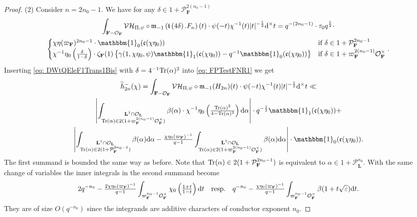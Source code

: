 \documentclass[A4]{amsart}
\numberwithin{equation}{section} \everymath{\displaystyle}
\newcommand{\Tr}{{\rm Tr}}
\newcommand{\id}{\mathbbm{1}}
\newcommand{\ud}{\mathrm{d}}
\newcommand{\F}{\mathbf{F}}
\newcommand{\bL}{\mathbf{L}}
\newcommand{\vO}{\mathcal{O}}
\newcommand{\vP}{\mathcal{P}}
\newcommand{\norm}[1][\cdot]{\lvert #1 \rvert}
\newcommand{\extnorm}[1]{\left\lvert #1 \right\rvert}
\newcommand{\Mult}{\mathfrak{m}}
\newcommand{\VorH}{\mathcal{VH}}
\newcommand{\Trans}{\mathfrak{t}}
\newcommand{\cond}{\mathfrak{c}}
\begin{document}
\begin{proof}
\noindent (2) Consider $n=2n_0-1$. We have for any $\delta \in 1+\vP_{\F}^{2(n_0-1)}$
\begin{multline} \label{eq: DWtQEleF1Trans1Bis}
	\int_{\F-\vO_{\F}} \VorH_{\Pi,\psi} \circ \Mult_{-1} \left( \Trans \left( 4\delta \right).F_n \right)(t) \cdot \psi(-t) \chi^{-1}(t) \norm[t]^{-\frac{1}{2}} \ud^{\times} t = q^{-(2n_0-1)} \cdot \tau_0 q^{\frac{1}{2}} \cdot \\
	\begin{cases}
		\chi\eta(\varpi_{\F})^{2n_0-1} \cdot \id_0(\cond(\chi \eta_0))  & \text{if } \delta \in 1+\vP_{\F}^{2n_0-1} \\
		\chi^{-1} \eta_0 \left( \tfrac{\delta}{1-\delta} \right) \cdot \zeta_{\F}(1) \left\{ \gamma(1,\chi \eta_0,\psi) \id_{1}(\cond(\chi \eta_0)) - q^{-1} \id_0(\cond(\chi \eta_0)) \right\} & \text{if } \delta \in 1+\varpi_{\F}^{2(n_0-1)} \vO_{\F}^{\times}
	\end{cases}.
\end{multline}
	Inserting \eqref{eq: DWtQEleF1Trans1Bis} with $\delta = 4^{-1} \Tr(\alpha)^2$ into \eqref{eq: FPTestFNR1} we get
\begin{multline} \label{eq: h2n-BdRedNRBis}
	\widetilde{h}_{2n}^-(\chi) = \int_{\F-\vO_{\F}} \VorH_{\Pi,\psi} \circ \Mult_{-1} (H_{2n})(t) \cdot \psi(-t) \chi^{-1}(t) \norm[t]^{-\frac{1}{2}} \ud^{\times} t \ll \\
	\extnorm{\int_{\substack{\bL^1 \cap \vO_{\bL} \\ \Tr(\alpha) \in 2(1+\varpi_{\F}^{2(n_0-1)} \vO_{\F}^{\times})}} \beta(\alpha) \cdot \chi^{-1} \eta_0 \left( \tfrac{\Tr(\alpha)^2}{4-\Tr(\alpha)^2} \right) \ud \alpha} \cdot q^{-\frac{1}{2}} \id_{1}(\cond(\chi \eta_0)) + \\
	\extnorm{ \int_{\substack{\bL^1 \cap \vO_{\bL} \\ \Tr(\alpha) \in 2(1+\vP_{\F}^{2n_0-1})}} \beta(\alpha) \ud \alpha - \tfrac{\chi\eta_0(\varpi_{\F})^{-1}}{q-1} \int_{\substack{\bL^1 \cap \vO_{\bL} \\ \Tr(\alpha) \in 2(1+\varpi_{\F}^{2(n_0-1)} \vO_{\F}^{\times})}} \beta(\alpha) \ud \alpha } \cdot \id_0(\cond(\chi \eta_0)).
\end{multline}
	The first summand is bounded the same way as before. Note that $\Tr(\alpha) \in 2(1+\vP_{\F}^{2n_0-1})$ is equivalent to $\alpha \in 1+\vP_{\bL}^{n_0}$. With the same change of variables the inner integrals in the second summand become
	$$ 2q^{-n_0} - \tfrac{2\chi\eta_0(\varpi_{\F})^{-1}}{q-1} \int_{\varpi_{\F}^{n_0-1} \vO_{\F}^{\times}} \chi_0 \left( \tfrac{1+t}{1-t} \right) \ud t \quad {\rm resp.} \quad q^{-n_0} - \tfrac{\chi\eta_0(\varpi_{\F})^{-1}}{q-1} \int_{\varpi_{\F}^{n_0-1} \vO_{\F}^{\times}} \beta(1+t \sqrt{\varepsilon}) \ud t. $$
	They are of size $O(q^{-n_0})$ since the integrands are additive characters of conductor exponent $n_0$.
\end{proof}
\end{document}
